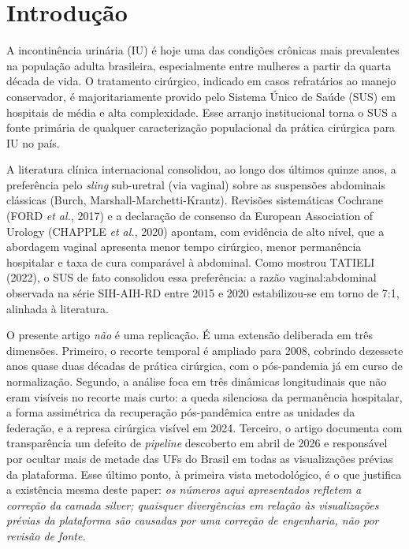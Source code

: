 \documentclass[12pt,a4paper,oneside]{article}
\begin{document}
\section{Introdução}\label{sec:intro}

A incontinência urinária (IU) é hoje uma das condições crônicas
mais prevalentes na população adulta brasileira, especialmente
entre mulheres a partir da quarta década de vida. O tratamento
cirúrgico, indicado em casos refratários ao manejo conservador,
é majoritariamente provido pelo Sistema Único de Saúde (SUS) em
hospitais de média e alta complexidade. Esse arranjo institucional
torna o SUS a fonte primária de qualquer caracterização populacional
da prática cirúrgica para IU no país.

A literatura clínica internacional consolidou, ao longo dos últimos
quinze anos, a preferência pelo \textit{sling} sub-uretral
(via vaginal) sobre as suspensões abdominais clássicas (Burch,
Marshall-Marchetti-Krantz). Revisões sistemáticas Cochrane (FORD
\textit{et al.}, 2017) e a declaração de consenso da European
Association of Urology (CHAPPLE \textit{et al.}, 2020) apontam, com
evidência de alto nível, que a abordagem vaginal apresenta menor
tempo cirúrgico, menor permanência hospitalar e taxa de cura
comparável à abdominal. Como mostrou TATIELI (2022), o SUS de
fato consolidou essa preferência: a razão vaginal:abdominal
observada na série SIH-AIH-RD entre 2015 e 2020 estabilizou-se
em torno de 7:1, alinhada à literatura.

O presente artigo \textit{não} é uma replicação. É uma extensão
deliberada em três dimensões. Primeiro, o recorte temporal é
ampliado para 2008, cobrindo dezessete anos
\textemdash{} quase duas décadas de prática cirúrgica, com o
pós-pandemia já em curso de normalização. Segundo, a análise foca
em três dinâmicas longitudinais que não eram visíveis no recorte
mais curto: a queda silenciosa da permanência hospitalar, a
forma assimétrica da recuperação pós-pandêmica entre as unidades
da federação, e a represa cirúrgica visível em 2024.
Terceiro, o artigo documenta com transparência um defeito de
\textit{pipeline} descoberto em abril de 2026 e responsável por
ocultar mais de metade das UFs do Brasil em todas as visualizações
prévias da plataforma. Esse último ponto, à primeira vista
metodológico, é o que justifica a existência mesma deste paper:
\textit{os números aqui apresentados refletem a correção da camada
silver; quaisquer divergências em relação às visualizações prévias
da plataforma são causadas por uma correção de engenharia, não por
revisão de fonte.}
\end{document}
